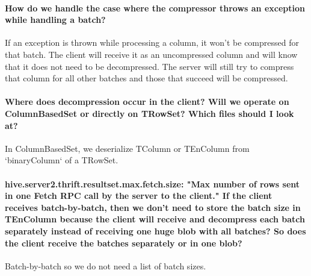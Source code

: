 \documentclass[11pt,a4paper]{article}
\begin{document}
	\paragraph{How do we handle the case where the compressor throws an exception while handling a batch?}
	If an exception is thrown while processing a column, it won't be compressed for that batch. The client will receive it as an uncompressed column and will know that it does not need to be decompressed. The server will still try to compress that column for all other batches and those that succeed will be compressed.
	
	\paragraph{Where does decompression occur in the client? Will we operate on ColumnBasedSet or directly on TRowSet? Which files should I look at?}
	In ColumnBasedSet, we deserialize TColumn or TEnColumn from `binaryColumn` of a TRowSet.
	
	\paragraph{hive.server2.thrift.resultset.max.fetch.size: "Max number of rows sent in one Fetch RPC call by the server to the client." If the client receives batch-by-batch, then we don't need to store the batch size in TEnColumn because the client will receive and decompress each batch separately instead of receiving one huge blob with all batches? So does the client receive the batches separately or in one blob?}
	Batch-by-batch so we do not need a list of batch sizes.
	
\end{document}
